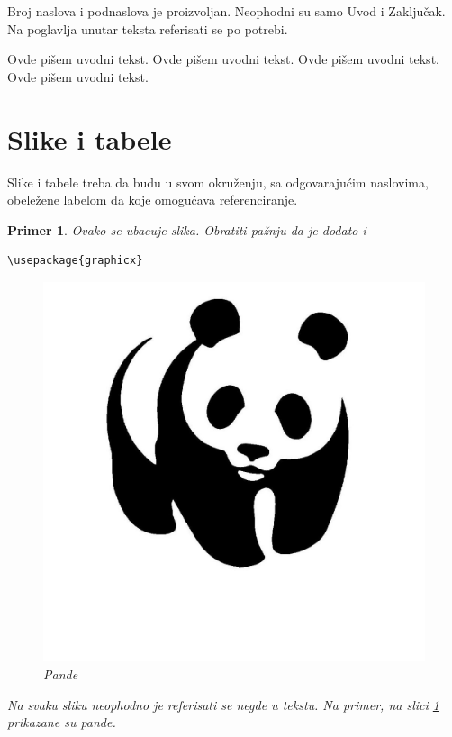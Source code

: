 \documentclass[a4paper]{article}
\newtheorem{primer}{Primer}[section]
\begin{document}
{Broj naslova i podnaslova je proizvoljan. Neophodni su samo Uvod i Zaključak. Na poglavlja unutar teksta referisati se po potrebi. 


Ovde pišem uvodni tekst.
Ovde pišem uvodni tekst. 
Ovde pišem uvodni tekst. 
Ovde pišem uvodni tekst. 


\section{Slike i tabele}
\label{slike_i_tabele}

Slike i tabele treba da budu u svom okruženju, sa odgovarajućim naslovima, obeležene labelom da koje omogućava referenciranje. 

\begin{primer} Ovako se ubacuje slika. Obratiti pažnju da je dodato i 
\begin{verbatim}
\usepackage{graphicx}
\end{verbatim}

\begin{figure}[h!]
\begin{center}
\includegraphics[scale=0.75]{panda.jpg}
\end{center}
\caption{Pande}
\label{fig:pande}
\end{figure}

Na svaku sliku neophodno je referisati se negde u tekstu. Na primer, na slici \ref{fig:pande} prikazane su pande. 
\end{primer}

}
\end{document}
